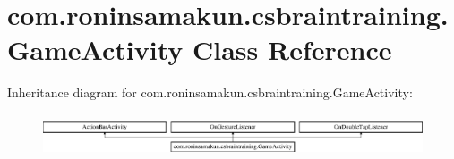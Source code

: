 \section{com.\+roninsamakun.\+csbraintraining.\+Game\+Activity Class Reference}
\label{classcom_1_1roninsamakun_1_1csbraintraining_1_1_game_activity}
Inheritance diagram for com.\+roninsamakun.\+csbraintraining.\+Game\+Activity\+:\begin{figure}[H]
\begin{center}
\leavevmode
\includegraphics[height=1.282932cm]{classcom_1_1roninsamakun_1_1csbraintraining_1_1_game_activity}
\end{center}
\end{figure}
